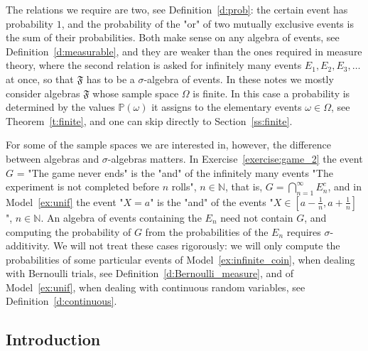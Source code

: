 	The relations we require are two, see Definition~\ref{d:prob}: the certain event has probability $1$, and the probability of the "or" of two mutually exclusive events is the sum of their probabilities. Both make sense on any algebra of events, see Definition~\ref{d:measurable}, and they are weaker than the ones required in measure theory, where the second relation is asked for infinitely many events $E_1, E_2, E_3, \ldots$ at once, so that $\mathfrak F$ has to be a $\sigma$-algebra of events. In these notes we mostly consider algebras $\mathfrak F$ whose sample space $\Omega$ is finite. In this case a probability is determined by the values $\mathbb P(\omega)$ it assigns to the elementary events $\omega \in \Omega$, see Theorem~\ref{t:finite}, and one can skip directly to Section~\ref{ss:finite}.

	For some of the sample spaces we are interested in, however, the difference between algebras and $\sigma$-algebras matters. In Exercise~\ref{exercise:game_2} the event $G$ = "The game never ends" is the "and" of the infinitely many events "The experiment is not completed before $n$ rolls", $n \in \mathbb N$, that is, $G = \bigcap_{n = 1}^\infty E_n^c$, and in Model~\ref{ex:unif} the event "$X = a$" is the "and" of the events "$X \in [a - \frac1n, a + \frac1n]$", $n \in \mathbb N$. An algebra of events containing the $E_n$ need not contain $G$, and computing the probability of $G$ from the probabilities of the $E_n$ requires $\sigma$-additivity. We will not treat these cases rigorously: we will only compute the probabilities of some particular events of Model~\ref{ex:infinite_coin}, when dealing with Bernoulli trials, see Definition~\ref{d:Bernoulli_measure}, and of Model~\ref{ex:unif}, when dealing with continuous random variables, see Definition~\ref{d:continuous}.


  	\subsection{Introduction}

